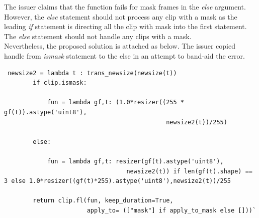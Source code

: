 \documentclass[a4paper, 11pt]{article}
\begin{document}
The issuer claims that the function fails for mask frames in the \textit{else} argument. However, the \textit{else} statement should not process any clip with a mask as the leading \textit{if} statement is directing all the clip with mask into the first statement. The \textit{else} statement should not handle any clips with a mask. \\

Nevertheless, the proposed solution is attached as below. The issuer copied handle from \textit{ismask} statement to the else in an attempt to band-aid the error.
\begin{lstlisting}
 newsize2 = lambda t : trans_newsize(newsize(t))
        if clip.ismask:
            
            fun = lambda gf,t: (1.0*resizer((255 * gf(t)).astype('uint8'),
                                             newsize2(t))/255)

        else:
            
            fun = lambda gf,t: resizer(gf(t).astype('uint8'),
                                  newsize2(t)) if len(gf(t).shape) == 3 else 1.0*resizer((gf(t)*255).astype('uint8'),newsize2(t))/255

        return clip.fl(fun, keep_duration=True,
                       apply_to= (["mask"] if apply_to_mask else []))`
\end{lstlisting}
\end{document}
